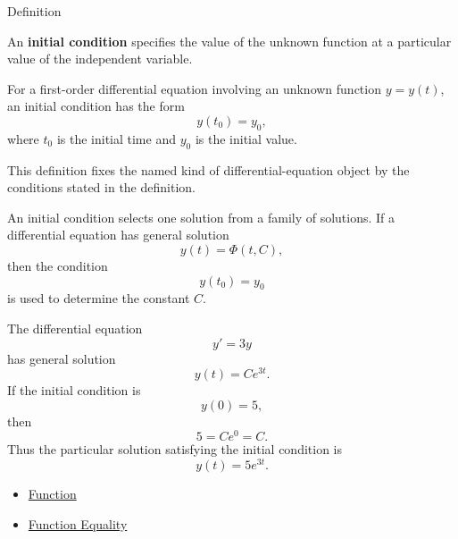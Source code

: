 
\begin{definitionbox}{Definition}
\begin{definition}
\label{def:ordinary-differential-equations-solutions-initial-condition}
An \textbf{initial condition} specifies the value of the unknown function at a particular value of the independent variable.

For a first-order differential equation involving an unknown function $y=y(t)$, an initial condition has the form
\[
y(t_0)=y_0,
\]
where $t_0$ is the initial time and $y_0$ is the initial value.
\end{definition}
\end{definitionbox}

\begin{remark*}
This definition fixes the named kind of differential-equation object by the
conditions stated in the definition.
\end{remark*}

\begin{remark*}[Interpretation]
An initial condition selects one solution from a family of solutions. If a differential equation has general solution
\[
y(t)=\Phi(t,C),
\]
then the condition
\[
y(t_0)=y_0
\]
is used to determine the constant $C$.
\end{remark*}

\begin{remark*}[Examples]
The differential equation
\[
y'=3y
\]
has general solution
\[
y(t)=Ce^{3t}.
\]
If the initial condition is
\[
y(0)=5,
\]
then
\[
5=Ce^{0}=C.
\]
Thus the particular solution satisfying the initial condition is
\[
y(t)=5e^{3t}.
\]
\end{remark*}

\begin{dependencies}
\begin{itemize}
  \item \hyperref[def:function]{Function}
  \item \hyperref[def:function-equality]{Function Equality}
\end{itemize}
\end{dependencies}


